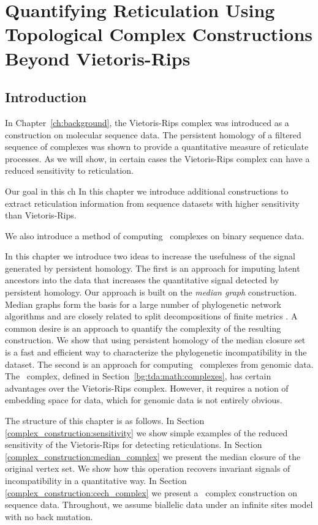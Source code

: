 \chapter{Quantifying Reticulation Using Topological Complex Constructions Beyond Vietoris-Rips}
\label{ch:complex_construction}

\section{Introduction}
\label{complex_construction:introduction}

In Chapter~\ref{ch:background}, the Vietoris-Rips complex was introduced as a construction on molecular sequence data.
The persistent homology of a filtered sequence of complexes was shown to provide a quantitative measure of reticulate processes.
As we will show, in certain cases the Vietoris-Rips complex can have a reduced sensitivity to reticulation.

Our goal in this ch
In this chapter we introduce additional constructions to extract reticulation information from sequence datasets with higher sensitivity than Vietoris-Rips.


We also introduce a method of computing \Cech\ complexes on binary sequence data.

In this chapter we introduce two ideas to increase the usefulness of the signal generated by persistent homology.
The first is an approach for imputing latent ancestors into the data that increases the quantitative signal detected by persistent homology.
Our approach is built on the \emph{median graph} construction.
Median graphs form the basis for a large number of phylogenetic network algorithms and are closely related to split decompositions of finite metrics \cite{Bandelt:1999,Bandelt:1992}.
A common desire is an approach to quantify the complexity of the resulting construction.
We show that using persistent homology of the median closure set is a fast and efficient way to characterize the phylogenetic incompatibility in the dataset.
The second is an approach for computing \Cech\ complexes from genomic data.
The \Cech\ complex, defined in Section~\ref{bg:tda:math:complexes}, has certain advantages over the Vietoris-Rips complex.
However, it requires a notion of embedding space for data, which for genomic data is not entirely obvious.

The structure of this chapter is as follows.
In Section \ref{complex_construction:sensitivity} we show simple examples of the reduced sensitivity of the Vietoris-Rips for detecting reticulations.
In Section \ref{complex_construction:median_complex} we present the median closure of the original vertex set.
We show how this operation recovers invariant signals of incompatibility in a quantitative way.
In Section \ref{complex_construction:cech_complex} we present a \Cech\ complex construction on sequence data.
Throughout, we assume biallelic data under an infinite sites model with no back mutation.

